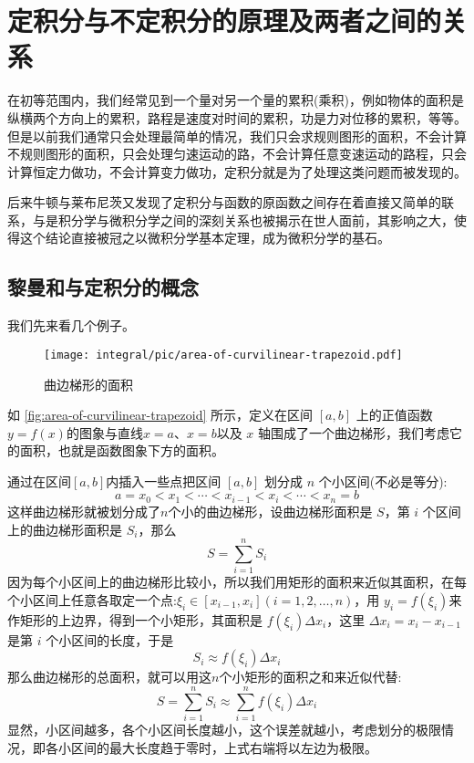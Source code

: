 
\section{定积分与不定积分的原理及两者之间的关系}
\label{sec:principle-and-relation-between-definite-and-indefinite-integral}

在初等范围内，我们经常见到一个量对另一个量的累积(乘积)，例如物体的面积是纵横两个方向上的累积，路程是速度对时间的累积，功是力对位移的累积，等等。但是以前我们通常只会处理最简单的情况，我们只会求规则图形的面积，不会计算不规则图形的面积，只会处理匀速运动的路，不会计算任意变速运动的路程，只会计算恒定力做功，不会计算变力做功，定积分就是为了处理这类问题而被发现的。

后来牛顿与莱布尼茨又发现了定积分与函数的原函数之间存在着直接又简单的联系，与是积分学与微积分学之间的深刻关系也被揭示在世人面前，其影响之大，使得这个结论直接被冠之以微积分学基本定理，成为微积分学的基石。

\subsection{黎曼和与定积分的概念}
\label{sec:riemann-sum-and-concept-of-definite-integral}

我们先来看几个例子。

\begin{example}[曲边梯形的面积]
\begin{figure}
  \centering
  \texttt{[image: integral/pic/area-of-curvilinear-trapezoid.pdf]}
  \caption{曲边梯形的面积}
  \label{fig:area-of-curvilinear-trapezoid}
\end{figure}

如 \autoref{fig:area-of-curvilinear-trapezoid} 所示，定义在区间 $[a,b]$ 上的正值函数 $y=f(x)$的图象与直线$x=a$、$x=b$以及 $x$ 轴围成了一个曲边梯形，我们考虑它的面积，也就是函数图象下方的面积。

通过在区间$[a,b]$内插入一些点把区间 $[a,b]$ 划分成 $n$ 个小区间(不必是等分):
\[ a=x_0<x_1< \cdots < x_{i-1} < x_i < \cdots < x_n = b \]
这样曲边梯形就被划分成了$n$个小的曲边梯形，设曲边梯形面积是 $S$，第 $i$ 个区间上的曲边梯形面积是 $S_i$，那么
\[ S = \sum_{i=1}^n S_i \]
因为每个小区间上的曲边梯形比较小，所以我们用矩形的面积来近似其面积，在每个小区间上任意各取定一个点:$\xi_i\in [x_{i-1}, x_i](i=1,2,\ldots,n)$，用 $y_i=f(\xi_i)$来作矩形的上边界，得到一个小矩形，其面积是 $f(\xi_i) \Delta x_i$，这里 $\Delta x_i = x_i-x_{i-1}$ 是第 $i$ 个小区间的长度，于是
\[ S_i \approx f(\xi_i) \Delta x_i \]
那么曲边梯形的总面积，就可以用这$n$个小矩形的面积之和来近似代替:
\[ S = \sum_{i=1}^n S_i \approx \sum_{i=1}^n f(\xi_i) \Delta x_i \]
显然，小区间越多，各个小区间长度越小，这个误差就越小，考虑划分的极限情况，即各小区间的最大长度趋于零时，上式右端将以左边为极限。
\end{example}

